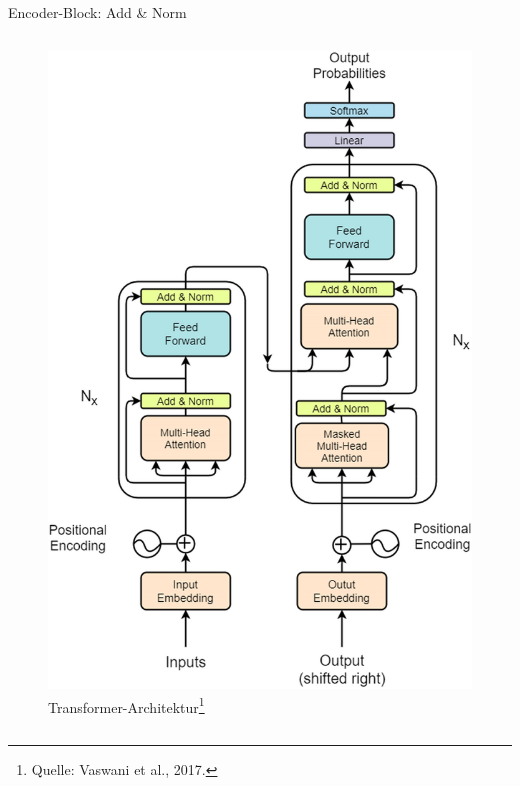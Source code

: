 \documentclass[aspectratio=1610, xcolor=dvipsnames, 9pt]{beamer}
\begin{document}
\begin{frame}{Encoder-Block: Add \& Norm}
\begin{columns}
\begin{column}{0.3\textwidth}
\begin{figure}
        \includegraphics[width=0.9\columnwidth]{images/Transformer-architecture-figure-sourced-from-original-paper-26.png}
        \caption{Transformer-Architektur\footnote{Quelle: Vaswani et al., 2017.}}
      \end{figure}
    \end{column}
  \end{columns}
\end{frame}
\end{document}
